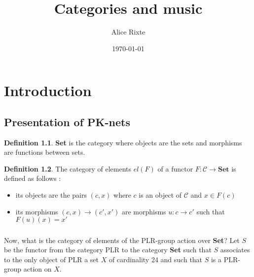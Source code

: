 \documentclass{report}
\theoremstyle{plain}
\theoremstyle{definition}
\newtheorem{defn}{Definition}[section]
\theoremstyle{remark}
\begin{document}
\title{Categories and music}
\author{Alice Rixte}
\date{\today}
\maketitle %


\chapter{Introduction}
\section{Presentation of PK-nets}
\begin{defn}\textbf{Set} is the category where objects are the sets and morphisms are functions between sets.\end{defn}


\begin{figure}[h]
    \centering
    \label{PK-net definition}
\end{figure}



\begin{defn} The category of elements $el(F)$ of a functor $F : \mathcal{C}\rightarrow \textbf{Set}$ is defined as follows :
    \begin{itemize}
        \item its objects are the pairs $(c,x)$ where $c$ is an object of $\mathcal{C}$ and $x\in F(c)$
        \item its morphisms $(c,x)\rightarrow (c',x')$ are morphisms $u : c\rightarrow c'$ such that $F(u)(x) = x'$
    \end{itemize}

  

\end{defn}

\paragraph{}
Now, what is the category of elements of the PLR-group action over \textbf{Set}? Let $S$ be the functor from the category PLR to the category \textbf{Set} such that $S$ associates to the only object of PLR a set $X$ of cardinality 24 and such that $S$ is a PLR-group action on $X$.
\end{document}
